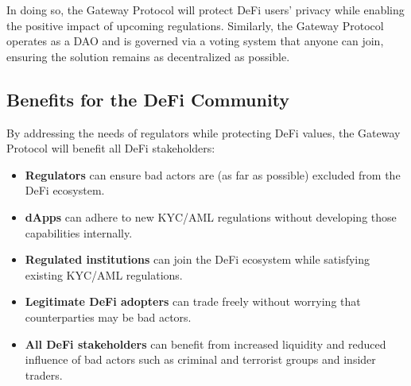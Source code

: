 In doing so, the Gateway Protocol will protect DeFi users’ privacy while enabling the positive impact of upcoming regulations. Similarly, the Gateway Protocol operates as a DAO and is governed via a voting system that anyone can join, ensuring the solution remains as decentralized as possible.

\subsection{Benefits for the DeFi Community}

By addressing the needs of regulators while protecting DeFi values, the Gateway Protocol will benefit all DeFi stakeholders:
\begin{itemize}
\item \textbf{Regulators} can ensure bad actors are (as far as possible) excluded from the DeFi ecosystem.
\item \textbf{dApps} can adhere to new KYC/AML regulations without developing those capabilities internally.
\item \textbf{Regulated institutions} can join the DeFi ecosystem while satisfying existing KYC/AML regulations.
\item \textbf{Legitimate DeFi adopters} can trade freely without worrying that counterparties may be bad actors.
\item \textbf{All DeFi stakeholders} can benefit from increased liquidity and reduced influence of bad actors such as criminal and terrorist groups and insider traders.
\end{itemize}
